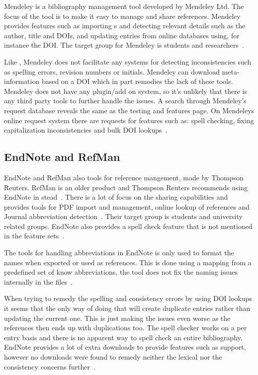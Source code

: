 Mendeley is a bibliography management tool developed by Mendeley Ltd.
The focus of the tool is to make it easy to manage and share
references.  Mendeley provides features such as importing s
and detecting relevant details such as the author, title and DOIs, and
updating entries from online databases using, for instance the DOI.
The target group for Mendeley is students and
researchers~\cite{mendeley_features}.

Like {\bibtex}, Mendeley does not facilitate any systems for detecting
inconsistencies such as spelling errors, revision numbers or initials.
Mendeley can download meta-information based on a DOI which in part
remodies the lack of these tools.  Mendeley does not have any
plugin/add on system, so it's unlikely that there is any third party
tools to further handle the {\bibtex} issues. A search through
Mendeley's request database reveals the same as the testing and
features page.  On Mendeleys online request system there are requests
for features such as: spell checking, fixing capitalization
inconsistencies and bulk DOI
lookups~\cite{mendeley_request_spellcheck, mendeley_request_lowercase,
  mendeley_request_capitalization, mendeley_request_bulk_doi}.

\subsection{EndNote and RefMan}
EndNote and RefMan also tools for reference mangement, made by
Thompson Reuters.  RefMan is an older product and Thompson Reuters
recommends using EndNote in stead~\cite{refman_switch,
  refman_features}.  There is a lot of focus on the sharing
capabilities and provides tools for PDF import and management, online
lookup of references and Journal abbreviation
detection~\cite{endnote_basic_features, endnote_x7_features}.  Their
target group is students and university related groups.  EndNote also
provides a spell check feature that is not mentioned in the feature
sets~\cite{endnote_spellcheck}.

The tools for handling abbreviations in EndNote is only used to format
the names when exported or used as references.  This is done using a
mapping from a predefined set of know abbreviations, the tool does not
fix the naming issues internally in the
files~\cite{endnote_terms_journals}.

When trying to remedy the spelling and consistency errors by using DOI
lookups it seems that the only way of doing that will create duplicate
entries rather than updating the current one. This is just making the
issues even worse as the references then ends up with duplications
too.  The spell checker works on a per entry basis and there is no
apparent way to spell check an entire bibliography.  EndNote provides
a lot of extra downloads to provide features such as {\bibtex}
support, however no downloads were found to remedy neither the lexical
nor the consistency concerns further~\cite{endnote_downloads}.



